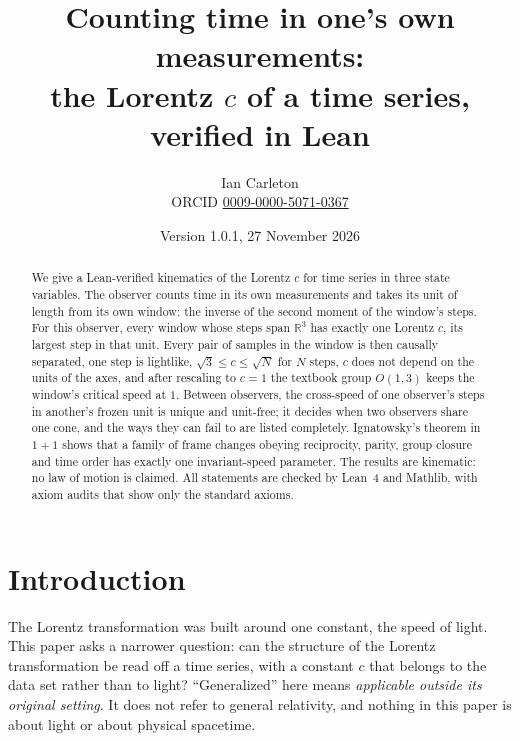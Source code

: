 \documentclass[11pt]{article}
\title{Counting time in one's own measurements:\\ the Lorentz $c$ of a time series, verified in Lean}
\author{Ian Carleton\\ \small ORCID \href{https://orcid.org/0009-0000-5071-0367}{0009-0000-5071-0367}}
\date{Version 1.0.1, 27 November 2026}
\newcommand{\R}{\mathbb{R}}
\theoremstyle{definition}
\theoremstyle{plain}
\theoremstyle{remark}
\begin{document}
\maketitle

\begin{abstract}
We give a Lean-verified kinematics of the Lorentz $c$ for time series in three state variables. The observer counts time in its own measurements and takes its unit of length from its own window: the inverse of the second moment of the window's steps. For this observer, every window whose steps span $\R^3$ has exactly one Lorentz $c$, its largest step in that unit. Every pair of samples in the window is then causally separated, one step is lightlike, $\sqrt3 \le c \le \sqrt N$ for $N$ steps, $c$ does not depend on the units of the axes, and after rescaling to $c=1$ the textbook group $O(1,3)$ keeps the window's critical speed at $1$. Between observers, the cross-speed of one observer's steps in another's frozen unit is unique and unit-free; it decides when two observers share one cone, and the ways they can fail to are listed completely. Ignatowsky's theorem in $1+1$ shows that a family of frame changes obeying reciprocity, parity, group closure and time order has exactly one invariant-speed parameter. The results are kinematic: no law of motion is claimed. All statements are checked by Lean~4 and Mathlib, with axiom audits that show only the standard axioms.
\end{abstract}

\tableofcontents

\section{Introduction}\label{sec:intro}

The Lorentz transformation was built around one constant, the speed of light. This paper asks a narrower question: can the structure of the Lorentz transformation be read off a time series, with a constant $c$ that belongs to the data set rather than to light? ``Generalized'' here means \emph{applicable outside its original setting}. It does not refer to general relativity, and nothing in this paper is about light or about physical spacetime.
\end{document}
